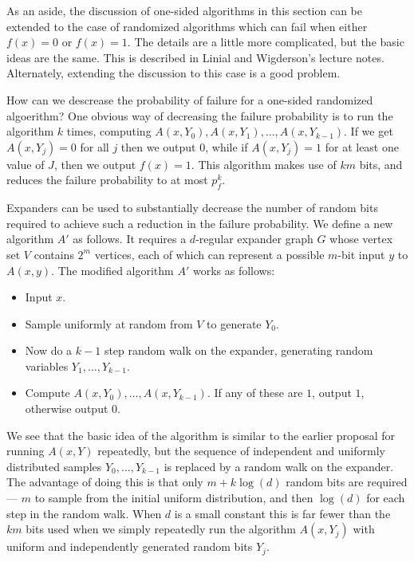 \documentclass[12pt]{article}
\begin{document}
As an aside, the discussion of one-sided algorithms in this section
can be extended to the case of randomized algorithms which can fail
when either $f(x) = 0$ or $f(x) = 1$.  The details are a little more
complicated, but the basic ideas are the same.  This is described in
Linial and Wigderson's lecture notes.  Alternately, extending the
discussion to this case is a good problem.

How can we descrease the probability of failure for a one-sided
randomized algoerithm?  One obvious way of decreasing the failure
probability is to run the algorithm $k$ times, computing
$A(x,Y_0),A(x,Y_1),\ldots,A(x,Y_{k-1})$.  If we get $A(x,Y_j) = 0$ for
all $j$ then we output $0$, while if $A(x,Y_j) = 1$ for at least one
value of $J$, then we output $f(x) = 1$.  This algorithm makes use of
$km$ bits, and reduces the failure probability to at most $p_f^k$.

Expanders can be used to substantially decrease the number of random
bits required to achieve such a reduction in the failure probability.
We define a new algorithm $A'$ as follows.  It requires a $d$-regular
expander graph $G$ whose vertex set $V$ contains $2^m$ vertices, each
of which can represent a possible $m$-bit input $y$ to $A(x,y)$.  The
modified algorithm $A'$ works as follows:
\begin{itemize}
\item Input $x$.

\item Sample uniformly at random from $V$ to generate $Y_0$.
  
\item Now do a $k-1$ step random walk on the expander, generating
  random variables $Y_1,\ldots, Y_{k-1}$.
  
\item Compute $A(x,Y_0),\ldots,A(x,Y_{k-1})$.  If any of these are
  $1$, output $1$, otherwise output $0$.
\end{itemize}
We see that the basic idea of the algorithm is similar to the earlier
proposal for running $A(x,Y)$ repeatedly, but the sequence of
independent and uniformly distributed samples $Y_0,\ldots,Y_{k-1}$ is
replaced by a random walk on the expander.  The advantage of doing
this is that only $m+k \log(d)$ random bits are required --- $m$ to
sample from the initial uniform distribution, and then $\log(d)$ for
each step in the random walk.  When $d$ is a small constant this is
far fewer than the $km$ bits used when we simply repeatedly run the
algorithm $A(x,Y_j)$ with uniform and independently generated random
bits $Y_j$.
\end{document}

